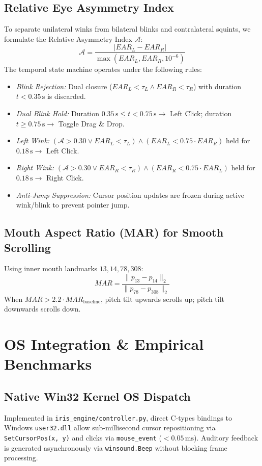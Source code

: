 \documentclass[conference]{IEEEtran}
\begin{document}
\subsection{Relative Eye Asymmetry Index}
To separate unilateral winks from bilateral blinks and contralateral squints, we formulate the Relative Asymmetry Index $\mathcal{A}$:
\begin{equation}
\mathcal{A} = \frac{|EAR_L - EAR_R|}{\max(EAR_L, EAR_R, 10^{-6})}
\end{equation}
The temporal state machine operates under the following rules:
\begin{itemize}
    \item \textit{Blink Rejection:} Dual closure ($EAR_L < \tau_L \land EAR_R < \tau_R$) with duration $t < 0.35\,\text{s}$ is discarded.
    \item \textit{Dual Blink Hold:} Duration $0.35\,\text{s} \le t < 0.75\,\text{s} \to$ Left Click; duration $t \ge 0.75\,\text{s} \to$ Toggle Drag \& Drop.
    \item \textit{Left Wink:} $(\mathcal{A} > 0.30 \lor EAR_L < \tau_L) \land (EAR_L < 0.75 \cdot EAR_R)$ held for $0.18\,\text{s} \to$ Left Click.
    \item \textit{Right Wink:} $(\mathcal{A} > 0.30 \lor EAR_R < \tau_R) \land (EAR_R < 0.75 \cdot EAR_L)$ held for $0.18\,\text{s} \to$ Right Click.
    \item \textit{Anti-Jump Suppression:} Cursor position updates are frozen during active wink/blink to prevent pointer jump.
\end{itemize}

\subsection{Mouth Aspect Ratio (MAR) for Smooth Scrolling}
Using inner mouth landmarks $13, 14, 78, 308$:
\begin{equation}
MAR = \frac{\|p_{13} - p_{14}\|_2}{\|p_{78} - p_{308}\|_2}
\end{equation}
When $MAR > 2.2 \cdot MAR_{\text{baseline}}$, pitch tilt upwards scrolls up; pitch tilt downwards scrolls down.

\section{OS Integration \& Empirical Benchmarks}

\subsection{Native Win32 Kernel OS Dispatch}
Implemented in \texttt{iris\_engine/controller.py}, direct C-types bindings to Windows \texttt{user32.dll} allow sub-millisecond cursor repositioning via \texttt{SetCursorPos(x, y)} and clicks via \texttt{mouse\_event} ($<0.05\,\text{ms}$). Auditory feedback is generated asynchronously via \texttt{winsound.Beep} without blocking frame processing.
\end{document}
